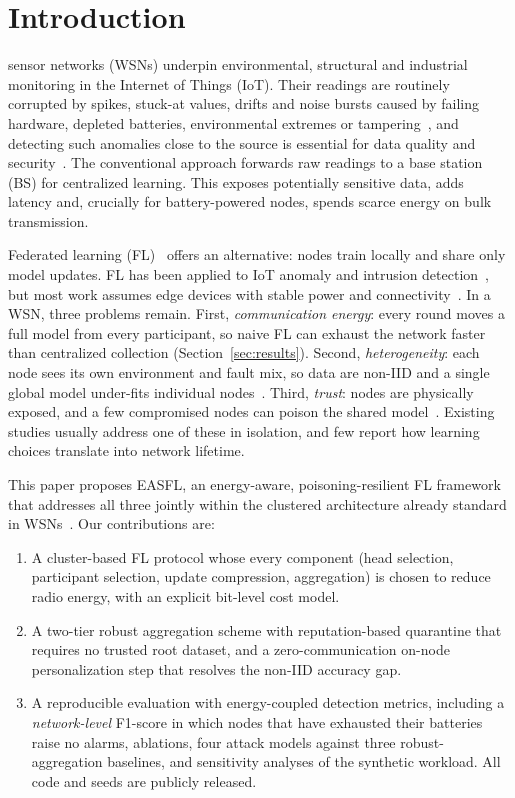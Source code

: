 \documentclass[journal]{IEEEtran}
\begin{document}
\section{Introduction}
 sensor networks (WSNs) underpin environmental, structural and industrial monitoring in the Internet of Things (IoT). Their readings are routinely corrupted by spikes, stuck-at values, drifts and noise bursts caused by failing hardware, depleted batteries, environmental extremes or tampering~\cite{ni2009,sharma2010}, and detecting such anomalies close to the source is essential for data quality and security~\cite{rajasegarar2008}. The conventional approach forwards raw readings to a base station (BS) for centralized learning. This exposes potentially sensitive data, adds latency and, crucially for battery-powered nodes, spends scarce energy on bulk transmission.

Federated learning (FL)~\cite{mcmahan2017,kairouz2021} offers an alternative: nodes train locally and share only model updates. FL has been applied to IoT anomaly and intrusion detection~\cite{nguyen2019diot,mothukuri2022}, but most work assumes edge devices with stable power and connectivity~\cite{lim2020}. In a WSN, three problems remain. First, \emph{communication energy}: every round moves a full model from every participant, so naive FL can exhaust the network faster than centralized collection (Section~\ref{sec:results}). Second, \emph{heterogeneity}: each node sees its own environment and fault mix, so data are non-IID and a single global model under-fits individual nodes~\cite{zhao2018,hsu2019}. Third, \emph{trust}: nodes are physically exposed, and a few compromised nodes can poison the shared model~\cite{blanchard2017,fang2020}. Existing studies usually address one of these in isolation, and few report how learning choices translate into network lifetime.

This paper proposes EASFL, an energy-aware, poisoning-resilient FL framework that addresses all three jointly within the clustered architecture already standard in WSNs~\cite{heinzelman2002,younis2004,abbasi2007}. Our contributions are:
\begin{enumerate}
\item A cluster-based FL protocol whose every component (head selection, participant selection, update compression, aggregation) is chosen to reduce radio energy, with an explicit bit-level cost model.
\item A two-tier robust aggregation scheme with reputation-based quarantine that requires no trusted root dataset, and a zero-communication on-node personalization step that resolves the non-IID accuracy gap.
\item A reproducible evaluation with energy-coupled detection metrics, including a \emph{network-level} F1-score in which nodes that have exhausted their batteries raise no alarms, ablations, four attack models against three robust-aggregation baselines, and sensitivity analyses of the synthetic workload. All code and seeds are publicly released.
\end{enumerate}
\end{document}
